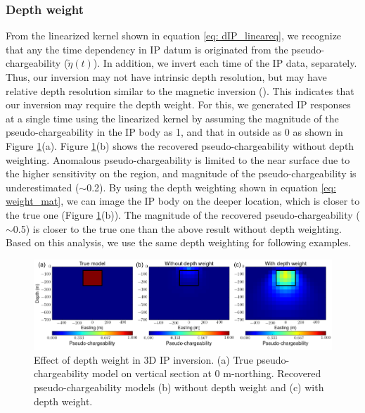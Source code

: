 \documentclass[a4paper, 11pt]{article}
\newcommand{\peta}{\tilde{\eta}}
\begin{document}
\subsubsection{Depth weight}
From the linearized kernel shown in equation \ref{eq: dIP_lineareq}, we recognize that any the time dependency in IP datum is originated from the pseudo-chargeability ($\peta(t)$). 
In addition, we invert each time of the IP data, separately. 
Thus, our inversion may not have intrinsic depth resolution, but may have relative depth resolution similar to the magnetic inversion (\cite{LiMag3D}). 
This indicates that our inversion may require the depth weight. 
For this, we generated IP responses at a single time using the linearized kernel by assuming the magnitude of the pseudo-chargeability in the IP body as 1, and that in outside as 0 as shown in Figure \ref{F:Depthweight}(a). 
Figure \ref{F:Depthweight}(b) shows the recovered pseudo-chargeability without depth weighting. 
Anomalous pseudo-chargeability is limited to the near surface due to the higher sensitivity on the region, and magnitude of the pseudo-chargeability is underestimated  ($\sim$0.2). 
By using the depth weighting shown in equation \ref{eq: weight_mat}, we can image the IP body on the deeper location, which is closer to the true one (Figure \ref{F:Depthweight}(b)). 
The magnitude of the recovered pseudo-chargeability ($\sim$0.5) is closer to the true one than the above result without depth weighting. 
Based on this analysis, we use the same depth weighting for following examples. 

\begin{figure}[htb]
  \centering
  \includegraphics[width=1.\textwidth]{figures/Depthweight.png}
  \caption{Effect of depth weight in 3D IP inversion. (a) True pseudo-chargeability model on vertical section at 0 m-northing. Recovered pseudo-chargeability models (b) without depth weight and (c) with depth weight.}
  \label{F:Depthweight}
\end{figure}
\clearpage

\end{document}
